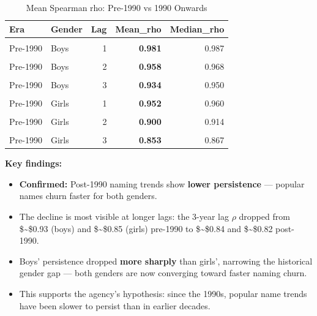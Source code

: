 \documentclass[
]{article}
\providecommand{\tightlist}{%
  \setlength{\itemsep}{0pt}\setlength{\parskip}{0pt}}
\begin{document}
\begin{longtable}[t]{llr>{}rr}
\caption{\label{tab:persistence-table}Mean Spearman rho: Pre-1990 vs 1990 Onwards}\\
\toprule
Era & Gender & Lag & Mean\_rho & Median\_rho\\
\midrule
\cellcolor{gray!10}{1990 onwards} & \cellcolor{gray!10}{Boys} & \cellcolor{gray!10}{1} & \textbf{\cellcolor{gray!10}{0.950}} & \cellcolor{gray!10}{0.952}\\
Pre-1990 & Boys & 1 & \textbf{0.981} & 0.987\\
\cellcolor{gray!10}{1990 onwards} & \cellcolor{gray!10}{Boys} & \cellcolor{gray!10}{2} & \textbf{\cellcolor{gray!10}{0.891}} & \cellcolor{gray!10}{0.905}\\
Pre-1990 & Boys & 2 & \textbf{0.958} & 0.968\\
\cellcolor{gray!10}{1990 onwards} & \cellcolor{gray!10}{Boys} & \cellcolor{gray!10}{3} & \textbf{\cellcolor{gray!10}{0.836}} & \cellcolor{gray!10}{0.852}\\
\addlinespace
Pre-1990 & Boys & 3 & \textbf{0.934} & 0.950\\
\cellcolor{gray!10}{1990 onwards} & \cellcolor{gray!10}{Girls} & \cellcolor{gray!10}{1} & \textbf{\cellcolor{gray!10}{0.937}} & \cellcolor{gray!10}{0.940}\\
Pre-1990 & Girls & 1 & \textbf{0.952} & 0.960\\
\cellcolor{gray!10}{1990 onwards} & \cellcolor{gray!10}{Girls} & \cellcolor{gray!10}{2} & \textbf{\cellcolor{gray!10}{0.868}} & \cellcolor{gray!10}{0.870}\\
Pre-1990 & Girls & 2 & \textbf{0.900} & 0.914\\
\addlinespace
\cellcolor{gray!10}{1990 onwards} & \cellcolor{gray!10}{Girls} & \cellcolor{gray!10}{3} & \textbf{\cellcolor{gray!10}{0.815}} & \cellcolor{gray!10}{0.809}\\
Pre-1990 & Girls & 3 & \textbf{0.853} & 0.867\\
\bottomrule
\end{longtable}

\textbf{Key findings:}

\begin{itemize}
\tightlist
\item
  \textbf{Confirmed:} Post-1990 naming trends show \textbf{lower
  persistence} --- popular names churn faster for both genders.
\item
  The decline is most visible at longer lags: the 3-year lag \(\rho\)
  dropped from \$\sim\$0.93 (boys) and \$\sim\$0.85 (girls) pre-1990 to
  \$\sim\$0.84 and \$\sim\$0.82 post-1990.
\item
  Boys' persistence dropped \textbf{more sharply} than girls', narrowing
  the historical gender gap --- both genders are now converging toward
  faster naming churn.
\item
  This supports the agency's hypothesis: since the 1990s, popular name
  trends have been slower to persist than in earlier decades.
\end{itemize}
\end{document}
